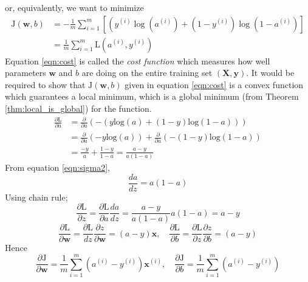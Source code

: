 \documentclass[12pt]{report}
\numberwithin{equation}{section}
\begin{document}
or, equivalently, we want to minimize 
\begin{equation}\label{eqn:cost}
\begin{split}
\mathrm{J}(\bm{w}, b) &=-\frac{1}{m} \sum_{i=1}^{m}\left[\left(y^{(i)} \log \left(a^{(i)}\right)+\left(1-y^{(i)}\right) \log \left(1-a^{(i)}\right)\right]\right. \\
	&=\frac{1}{m} \sum_{i=1}^{m} \mathrm{L}\left(a^{(i)}, y^{(i)}\right)
\end{split}
\end{equation}
Equation \eqref{eqn:cost} is called the \textit{cost function} which measures how well parameters $\bm{w}$ and $b$ are doing on the entire training set $(\bm{X},\bm{y})$. It would be required to show that $\mathrm{J}(\bm{w},b)$ given in equation \eqref{eqn:cost} is a convex function which guarantees a local minimum, which is a global minimum (from Theorem \ref{thm:local_is_global}) for the function. 
\begin{equation}
\begin{split}
\frac{\partial \mathrm{L}}{\partial a} &=
   \frac{\partial}{\partial a} \left ( - \left( y \text{log}(a) + (1-y)\text{log}(1-a)\right) \right ) \\ 
   &= \frac{\partial}{\partial a} \left ( - y \text{log} (a) \right ) +  \frac{\partial}{\partial a} \left (- (1-y)\text{log}(1-a) \right ) \\
   &=\frac{-y}{a} + \frac{1-y}{1-a} = \frac{a-y}{a(1-a)}
\end{split}
\end{equation}
From equation \eqref{eqn:sigma2}, 
\[ \frac{da}{dz} = a(1-a) \]
Using chain rule;
\begin{equation}\label{eqn:dldz}
\frac{\partial \mathrm{L}}{\partial z} = \frac{\partial \text{L}}{\partial a} \frac{d a}{d z} = \frac{a-y}{a(1-a)}a(1-a) = a-y  
\end{equation}
\[ \frac{\partial \mathrm{L}}{\partial \bm{w}} =
   \frac{\partial \mathrm{L}}{d z} \frac{\partial z}{\partial \bm{w}} = (a - y)\bm{x}, \quad
   \frac{\partial \text{L}}{\partial b} =
   \frac{\partial \text{L}}{\partial z} \frac{\partial z}{\partial b} = (a - y)
\]
Hence 
\begin{equation}\label{eqn:djdz}
\frac{\partial \mathrm{J}}{\partial \bm{w}} = \frac{1}{m}\sum_{i=1}^{m} (a^{(i)} - y^{(i)})\bm{x}^{(i)}, \quad \frac{\partial \mathrm{J}}{\partial b} = \frac{1}{m}\sum_{i=1}^{m} (a^{(i)} - y^{(i)})
\end{equation}
\end{document}
